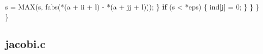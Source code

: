 \documentclass[
  12pt,
  letterpaper,
  DIV=11,
  numbers=noendperiod]{scrreprt}
\newenvironment{Shaded}{\begin{snugshade}}{\end{snugshade}}
\newcommand{\ControlFlowTok}[1]{\textcolor[rgb]{0.00,0.23,0.31}{\textbf{#1}}}
\newcommand{\DecValTok}[1]{\textcolor[rgb]{0.68,0.00,0.00}{#1}}
\newcommand{\NormalTok}[1]{\textcolor[rgb]{0.00,0.23,0.31}{#1}}
\newcommand{\OperatorTok}[1]{\textcolor[rgb]{0.37,0.37,0.37}{#1}}
\theoremstyle{remark}
\begin{document}
\begin{Shaded}
\begin{Highlighting}[]
\NormalTok{                s }\OperatorTok{=}\NormalTok{ MAX}\OperatorTok{(}\NormalTok{s}\OperatorTok{,}\NormalTok{ fabs}\OperatorTok{(*(}\NormalTok{a }\OperatorTok{+}\NormalTok{ ii }\OperatorTok{+}\NormalTok{ l}\OperatorTok{)} \OperatorTok{{-}} \OperatorTok{*(}\NormalTok{a }\OperatorTok{+}\NormalTok{ jj }\OperatorTok{+}\NormalTok{ l}\OperatorTok{)));}
            \OperatorTok{\}}
            \ControlFlowTok{if} \OperatorTok{(}\NormalTok{s }\OperatorTok{\textless{}} \OperatorTok{*}\NormalTok{eps}\OperatorTok{)} \OperatorTok{\{}
\NormalTok{              ind}\OperatorTok{[}\NormalTok{j}\OperatorTok{]} \OperatorTok{=} \DecValTok{0}\OperatorTok{;}
            \OperatorTok{\}}
        \OperatorTok{\}}
    \OperatorTok{\}}
\OperatorTok{\}}
\end{Highlighting}
\end{Shaded}

\subsection*{jacobi.c}\label{jacobi.c}
\end{document}
